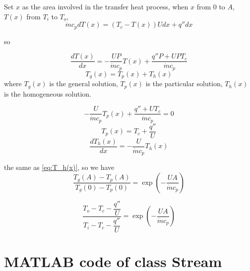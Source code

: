 Set $x$ as the area involved in the transfer heat process, when $x$ from $0$ to $A$, $T(x)$ from $T_{i}$ to $T_{o}$,
\begin{equation}
\dot{m}c_{p}dT(x)=(T_{c}-T(x))Udx+q''dx
\end{equation}

so

\begin{equation}
\frac{dT(x)}{dx}=-\frac{UP}{\dot{m}c_{p}}T(x)+\frac{q''P+UPT_{c}}{\dot{m}c_{p}}
\end{equation}
\begin{equation}
T_{g}(x)=T_{p}(x)+T_{h}(x)
\end{equation}
where $T_{g}(x)$ is the general solution, $T_{p}(x)$ is the particular
solution, $T_{h}(x)$ is the homogeneous solution.

\begin{equation}
-\frac{U}{\dot{m}c_{p}}T_{p}(x)+\frac{q''+UT_{c}}{\dot{m}c_{p}}=0
\end{equation}
\begin{equation}
T_{p}(x)=T_{c}+\frac{q''}{U}
\end{equation}
\begin{equation}
\frac{dT_{h}(x)}{dx}=-\frac{U}{\dot{m}c_{p}}T_{h}(x)
\end{equation}

the same as \autoref{eq:T_h(x)}, so we have
\begin{equation}
\frac{T_{g}(A)-T_{p}(A)}{T_{g}(0)-T_{p}(0)}=\exp(-\frac{UA}{\dot{m}c_{p}})
\end{equation}

\begin{equation}
\frac{T_{o}-T_{c}-\dfrac{q''}{U}}{T_{i}-T_{c}-\dfrac{q''}{U}}=\exp(-\frac{UA}{\dot{m}c_{p}})
\end{equation}

\chapter{MATLAB code of class Stream}
\label{cha:MATLAB_SOURCECODE}

